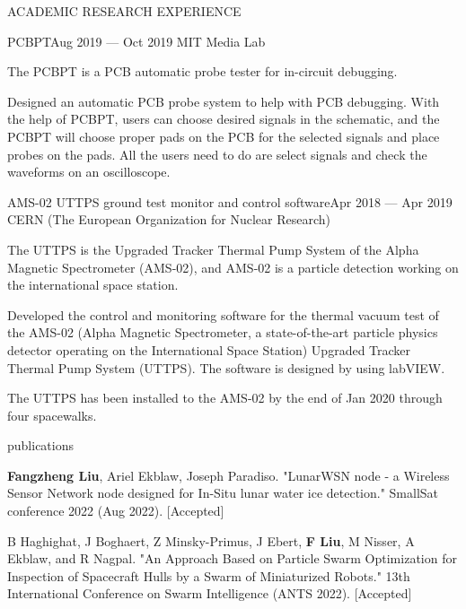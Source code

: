 \documentclass{resume} %
\begin{document}
\begin{rSection}{ACADEMIC RESEARCH EXPERIENCE}
\begin{rSubsection}{PCBPT}{Aug 2019 --- Oct 2019}{ }{MIT Media Lab}
\item The PCBPT is a PCB automatic probe tester for in-circuit debugging.
\item Designed an automatic PCB probe system to help with PCB debugging.
With the help of PCBPT, users can choose desired signals in the schematic,
and the PCBPT will choose proper pads on the PCB for the selected signals
and place probes on the pads. All the users need to do are select signals
and check the waveforms on an oscilloscope.
\end{rSubsection}

\begin{rSubsection}{AMS-02 UTTPS ground test monitor and control software}{Apr 2018 --- Apr 2019}{ }{CERN (The European Organization for Nuclear Research)}
\item The UTTPS is the Upgraded Tracker Thermal Pump System of the Alpha Magnetic Spectrometer (AMS-02), and AMS-02 is a particle detection working on the international space station.
\item Developed the control and monitoring software for the thermal vacuum test of the AMS-02 (Alpha Magnetic Spectrometer, a state-of-the-art particle physics detector operating on the International Space Station) Upgraded Tracker Thermal Pump System (UTTPS). The software is designed by using labVIEW.
\item The UTTPS has been installed to the AMS-02 by the end of Jan 2020 through four spacewalks.
\end{rSubsection}
\end{rSection}

\begin{rSection}{publications}

\begin{itemlabel}
\item \textbf{Fangzheng Liu}, Ariel Ekblaw, Joseph Paradiso.
"LunarWSN node - a Wireless Sensor Network node designed for In-Situ lunar water ice detection."
SmallSat conference 2022 (Aug 2022). [Accepted]
\smallskip
\smallskip
\smallskip
\item B Haghighat, J Boghaert, Z Minsky-Primus, J Ebert, \textbf{F Liu}, M Nisser, A Ekblaw, and R Nagpal.
"An Approach Based on Particle Swarm Optimization for Inspection of Spacecraft Hulls by a Swarm of Miniaturized Robots."
13th International Conference on Swarm Intelligence (ANTS 2022). [Accepted]
\end{itemlabel}
\end{rSection}
\end{document}
